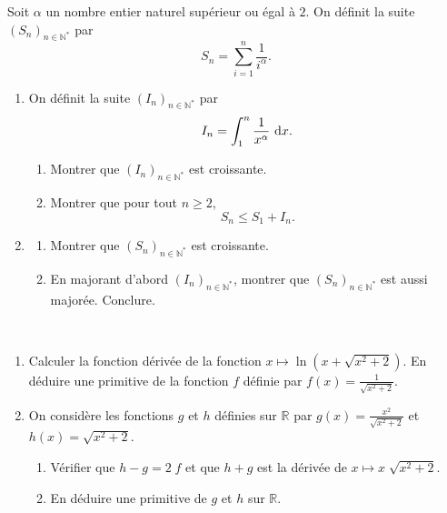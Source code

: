 \begin{exo}
      Soit $\alpha$ un nombre entier naturel sup\'erieur ou \'egal \`a $2$.
      On d\'efinit la suite $(S_n)_{n\in\mathbb{N}^*}$ par 
            \[
                  S_n= \sum_{i=1}^n \frac{1}{i^\alpha}      .
            \]
      \begin{enumerate}
            \item On d\'efinit la suite $(I_n)_{n\in\mathbb{N}^*}$ par 
                  \[
                        I_n = \int_{1}^{n} \frac{1}{x^\alpha} ~\mathrm{d}x      .
                  \]
                  \begin{enumerate}
                        \item Montrer que $(I_n)_{n\in\mathbb{N}^*}$ est croissante.
                        \item Montrer que pour tout $n\geq 2$,
                              \[
                                    S_n \leq S_1+ I_n      .
                              \]
                  \end{enumerate}
            \item \begin{enumerate}
                        \item Montrer que $(S_n)_{n\in\mathbb{N}^*}$ est croissante.
                        \item En majorant d'abord $(I_n)_{n\in\mathbb{N}^*}$, 
                              montrer que $(S_n)_{n\in\mathbb{N}^*}$ est aussi major\'ee.
                              Conclure.
                  \end{enumerate}
      \end{enumerate}
\end{exo}
\begin{exo} ~ \newline
\begin{enumerate}
\item Calculer la fonction d\'eriv\'ee de la fonction $x \mapsto \ln \left( x + \sqrt{x^2 + 2} \right) $.
      En d\'eduire une primitive de la fonction $f$ d\'efinie par $f(x) = \frac{1}{\sqrt{x^2 + 2}}$.
\item On consid\`ere les fonctions $g$ et $h$ d\'efinies sur $\mathbb{R}$ par 
      $g(x) = \frac{x^2}{\sqrt{x^2 + 2}}$ et $h(x) = \sqrt{x^2 + 2}$.
      \begin{enumerate}
      \item V\'erifier que $h - g = 2 \; f$ et que $h + g$ est la d\'eriv\'ee de $x \mapsto x \; \sqrt{x^2 + 2}$.
      \item En d\'eduire une primitive de $g$ et $h$ sur $\mathbb{R}$.
      \end{enumerate}
\end{enumerate}
\end{exo}
